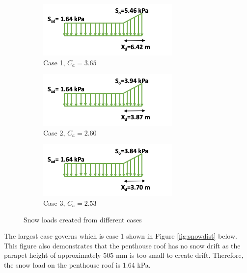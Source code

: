 \documentclass[12pt]{article}
\begin{document}
\begin{figure}[h!]
    \centering
    \begin{subfigure}[b]{0.4\linewidth}
        \includegraphics[width=\linewidth]{Assets/case1_snow.png}
        \caption{Case 1, $C_{a}=3.65$}
    \end{subfigure}
    \begin{subfigure}[b]{0.4\linewidth}
        \includegraphics[width=\linewidth]{Assets/case2_snow.png}
        \caption{Case 2, $C_{a}=2.60$}
    \end{subfigure}
    \begin{subfigure}[b]{0.4\linewidth}
        \includegraphics[width=\linewidth]{Assets/case3_snow.png}
        \caption{Case 3, $C_{a}=2.53$}
    \end{subfigure}
    \caption{Snow loads created from different cases}
    \label{fig:snowloads}
\end{figure}

The largest case governs which is case 1 shown in Figure \ref{fig:snowdist} below.
This figure also demonstrates that the penthouse roof has no snow drift as the parapet height of approximately 505 mm is too small to create drift.
Therefore, the snow load on the penthouse roof is 1.64 kPa.
\end{document}
